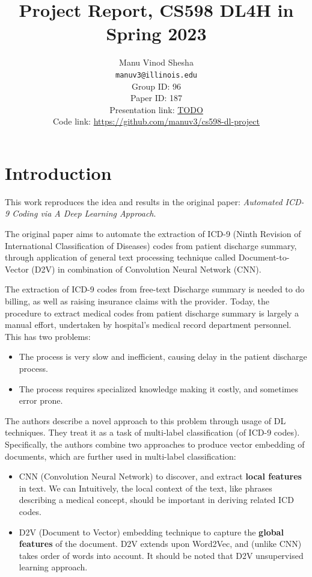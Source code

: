 \documentclass[11pt,a4paper]{article}
\title{Project Report, CS598 DL4H in Spring 2023}
\author{Manu Vinod Shesha \\
  \texttt{manuv3@illinois.edu}
  \\[2em]
  Group ID: 96\\
  Paper ID: 187\\
  Presentation link: \url{TODO} \\
  Code link: \url{https://github.com/manuv3/cs598-dl-project}}
\begin{document}
\maketitle


\section{Introduction}

This work reproduces the idea and results in the original paper: \textit{Automated ICD-9 Coding via A Deep Learning Approach}\cite{8320340}.

The original paper aims to automate the extraction of ICD-9 (Ninth Revision of International Classification of Diseases) codes from patient discharge summary, through application of general text processing technique called Document-to-Vector (D2V) in combination of Convolution Neural Network (CNN).

The extraction of ICD-9 codes from free-text Discharge summary is needed to do billing, as well as raising insurance claims with the provider. Today, the procedure to extract medical codes from patient discharge summary is largely a manual effort, undertaken by hospital’s medical record department personnel. This has two problems:
\begin{itemize}
    \item The process is very slow and inefficient, causing delay in the patient discharge process.
    \item The process requires specialized knowledge making it costly, and sometimes error prone.
\end{itemize}

The authors describe a novel approach to this problem through usage of DL techniques. They treat it as a task of multi-label classification (of ICD-9 codes). Specifically, the authors combine two approaches to produce vector embedding of documents, which are further used in multi-label classification:
\begin{itemize}
    \item CNN (Convolution Neural Network) to discover, and extract \textbf{local features} in text. We can Intuitively, the local context of the text, like phrases describing a medical concept, should be important in deriving related ICD codes.
    \item D2V (Document to Vector) \cite{le2014distributed} embedding technique to capture the \textbf{global features} of the document. D2V extends upon Word2Vec, and (unlike CNN) takes order of words into account. It should be noted that D2V unsupervised learning approach.
\end{itemize}
\end{document}
